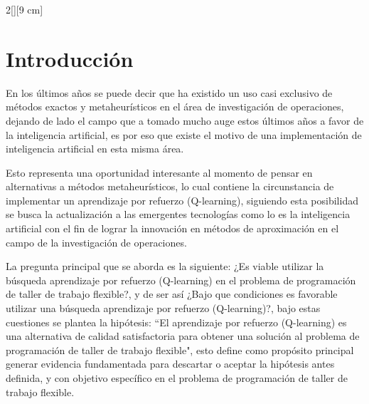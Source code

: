 \documentclass[letterpaper, 10 pt]{article}
\newcommand{\fjsp}{problema de programación de taller de trabajo flexible}
\begin{document}
%
\begin{multicols}{2}[][9 cm]
\section{Introducción}
En los últimos años se puede decir que ha existido un uso casi exclusivo de métodos exactos y metaheurísticos en el área de investigación de operaciones, dejando de lado el campo que a tomado mucho auge estos últimos años a favor de la inteligencia artificial, es por eso que existe el motivo de una implementación de inteligencia artificial en esta misma área.

Esto representa una oportunidad interesante al momento de pensar en alternativas a métodos metaheurísticos, lo cual contiene la circunstancia de implementar un aprendizaje por refuerzo (Q-learning), 
siguiendo esta posibilidad se busca la actualización a las emergentes tecnologías como lo es la inteligencia artificial con el fin de lograr la innovación en métodos de aproximación en el campo de la investigación de operaciones.

La pregunta principal que se aborda es la siguiente: ¿Es viable utilizar la búsqueda aprendizaje por refuerzo (Q-learning) en el \fjsp?, y de ser así ¿Bajo que condiciones es favorable utilizar una búsqueda aprendizaje por refuerzo (Q-learning)?, bajo estas cuestiones se plantea la hipótesis: ``El aprendizaje por refuerzo (Q-learning) es una alternativa de calidad satisfactoria para obtener una solución al \fjsp", esto define como propósito principal generar evidencia fundamentada para descartar o aceptar la hipótesis antes definida, y con objetivo específico en el problema de programación de taller de trabajo flexible. 


\end{multicols}
\end{document}
